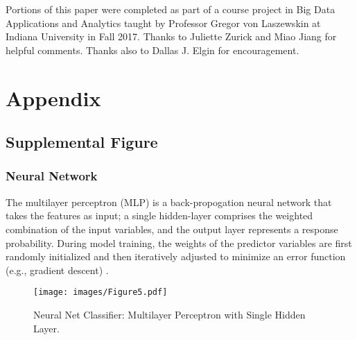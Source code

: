 \documentclass[sigconf]{acmart}
\begin{document}
\begin{acks}

Portions of this paper were completed as part of a course project in Big Data 
Applications and Analytics taught by Professor Gregor von Laszewskin at 
Indiana University in Fall 2017. Thanks to Juliette Zurick and Miao Jiang 
for helpful comments. Thanks also to Dallas J. Elgin for encouragement. 

\end{acks}

 

\appendix

\section{Appendix}

\subsection{Supplemental Figure}

\subsubsection{Neural Network} The multilayer perceptron (MLP) is a 
back-propogation neural network that takes the features as input; a 
single hidden-layer comprises the weighted combination of the input 
variables, and the output layer represents a response probability. 
During model training, the weights of the predictor variables are first 
randomly initialized and then iteratively adjusted to minimize an 
error function (e.g., gradient descent) \cite{brown12}.

\begin{figure}[!ht]
  \centering\texttt{[image: images/Figure5.pdf]}
  \caption{Neural Net Classifier: Multilayer Perceptron with Single Hidden Layer.}
  \label{f:Figure5}
\end{figure}
\end{document}
